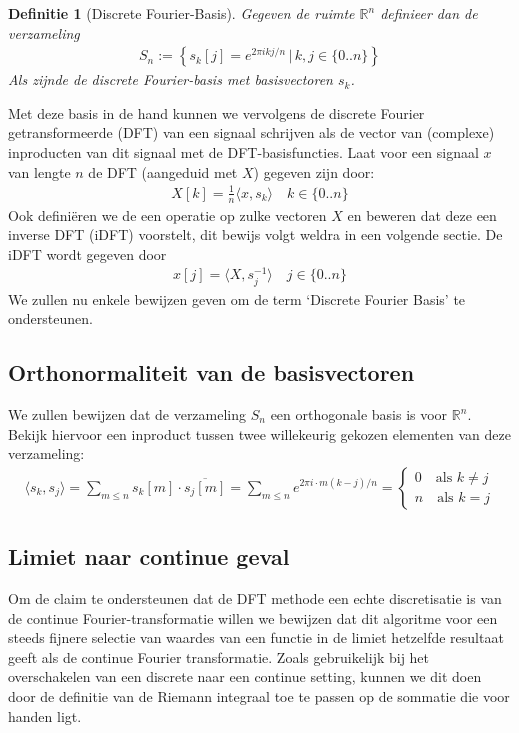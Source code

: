 \documentclass[11pt]{amsart}
\newcommand{\R}{\mathbb{R}}
\newtheorem*{definitie}{Definitie}
\theoremstyle{remark}
\newcommand{\eq}[1]{\begin{eqnarray*} #1 \end{eqnarray*}}
\newcommand{\largediv}{\,\big|\,}
\newcommand{\inpr}[2]{\langle #1 , #2 \rangle}
\newcommand{\dpii}{{2\pi i}}
\begin{document}
\begin{definitie}[Discrete Fourier-Basis] Gegeven de ruimte $\R^n$ definieer dan de verzameling
\eq{
  S_n := \left\{ s_k [j] = e^{\dpii k j/n } \largediv k,j \in \{0..n\} \right\}
}
Als zijnde de discrete Fourier-basis met basisvectoren $s_k$.
\end{definitie}
\vspace{-10pt}
Met deze basis in de hand kunnen we vervolgens de discrete Fourier getransformeerde (DFT) van een signaal schrijven als de vector van (complexe) inproducten van dit signaal met de DFT-basisfuncties. Laat voor een signaal $x$ van lengte $n$ de DFT (aangeduid met $X$) gegeven zijn door:
\eq{
  X[k] = \tfrac{1}{n} \inpr{x}{s_k} \quad k\in\{0..n\}
}
Ook defini\"eren we de een operatie op zulke vectoren $X$ en beweren dat deze een inverse DFT (iDFT) voorstelt, dit bewijs volgt weldra in een volgende sectie. De iDFT wordt gegeven door
\eq{
  x[j] = \inpr{X}{s_j^{-1}} \quad j\in \{0..n\}
}
We zullen nu enkele bewijzen geven om de term `Discrete Fourier Basis' te ondersteunen.

\subsection*{Orthonormaliteit van de basisvectoren}
We zullen bewijzen dat de verzameling $S_n$ een orthogonale basis is voor $\R^n$. Bekijk hiervoor een inproduct tussen twee
willekeurig gekozen elementen van deze verzameling:
\eq{
  \inpr{s_k}{s_j} = \sum_{m\leq n} s_k[m]\cdot \overline{s_j[m]} = \sum_{m\leq n} e^{\dpii\cdot m (k-j)/n} =
  \begin{cases}
    0 \quad \text{als } k\neq j\\
    n \quad \text{als } k = j
  \end{cases}
}

\subsection*{Limiet naar continue geval}
Om de claim te ondersteunen dat de DFT methode een echte discretisatie is van de continue Fourier-transformatie willen we bewijzen dat dit algoritme voor een steeds fijnere selectie van waardes van een functie in de limiet hetzelfde resultaat geeft als de continue Fourier transformatie. 
Zoals gebruikelijk bij het overschakelen van een discrete naar een continue setting, kunnen we dit doen 
door de definitie van de Riemann integraal toe te passen op de sommatie die voor handen ligt.
\end{document}
